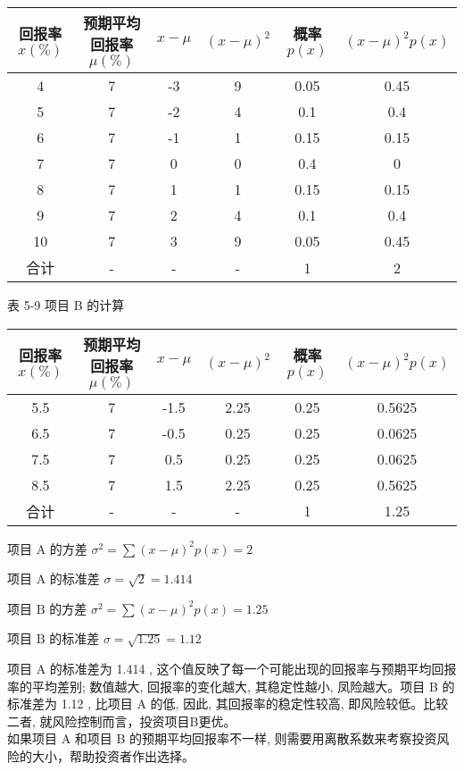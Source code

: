 \documentclass[10pt]{article}
\begin{document}
\begin{CJK*}{UTF8}{bsmi}
\begin{center}
\begin{tabular}{cccccc}
\hline
回报率 $x(\%)$ & 预期平均回报率 $\mu(\%)$ & $x-\mu$ & $(x-\mu)^{2}$ & 概率 $p(x)$ & $(x-\mu)^{2} p(x)$ \\
\hline
4 & 7 & -3 & 9 & 0.05 & 0.45 \\
5 & 7 & -2 & 4 & 0.1 & 0.4 \\
6 & 7 & -1 & 1 & 0.15 & 0.15 \\
7 & 7 & 0 & 0 & 0.4 & 0 \\
8 & 7 & 1 & 1 & 0.15 & 0.15 \\
9 & 7 & 2 & 4 & 0.1 & 0.4 \\
10 & 7 & 3 & 9 & 0.05 & 0.45 \\
\hline
合计 & - & - & - & 1 & 2 \\
\hline
\end{tabular}
\end{center}

表 5-9 项目 B 的计算

\begin{center}
\begin{tabular}{cccccc}
\hline
回报率 $x(\%)$ & 预期平均回报率 $\mu(\%)$ & $x-\mu$ & $(x-\mu)^{2}$ & 概率 $p(x)$ & $(x-\mu)^{2} p(x)$ \\
\hline
5.5 & 7 & -1.5 & 2.25 & 0.25 & 0.5625 \\
6.5 & 7 & -0.5 & 0.25 & 0.25 & 0.0625 \\
7.5 & 7 & 0.5 & 0.25 & 0.25 & 0.0625 \\
8.5 & 7 & 1.5 & 2.25 & 0.25 & 0.5625 \\
\hline
合计 & - & - & - & 1 & 1.25 \\
\hline
\end{tabular}
\end{center}

项目 $\mathrm{A}$ 的方差 $\sigma^{2}=\sum(x-\mu)^{2} p(x)=2$

项目 $\mathrm{A}$ 的标准差 $\sigma=\sqrt{2}=1.414$

项目 $\mathrm{B}$ 的方差 $\sigma^{2}=\sum(x-\mu)^{2} p(x)=1.25$

项目 $\mathrm{B}$ 的标准差 $\sigma=\sqrt{1.25}=1.12$

项目 $\mathrm{A}$ 的标准差为 1.414 , 这个值反映了每一个可能出现的回报率与预期平均回报率的平均差别; 数值越大, 回报率的变化越大, 其稳定性越小, 凤险越大。项目 B 的标准差为 1.12 , 比项目 $\mathrm{A}$ 的低, 因此, 其回报率的稳定性较高, 即风险较低。比较二者, 就风险控制而言，投资项目B更优。\\
如果项目 $\mathrm{A}$ 和项目 B 的预期平均回报率不一样, 则需要用离散系数来考察投资风险的大小，帮助投资者作出选择。


\end{CJK*}
\end{document}
